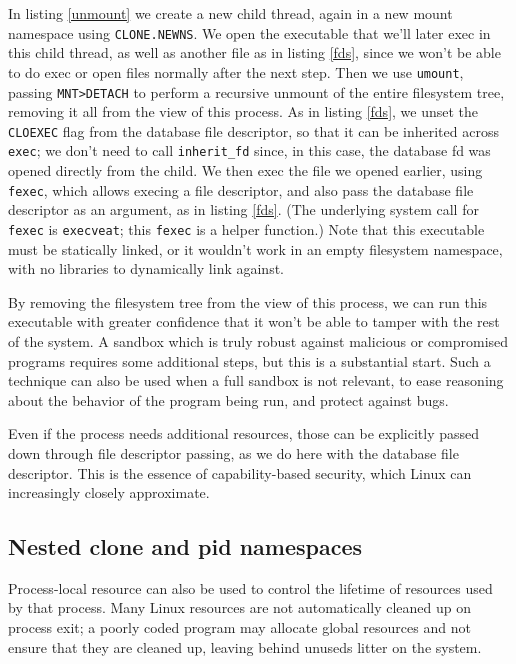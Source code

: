 \documentclass{acmart}
\begin{document}
In listing \ref{unmount}
we create a new child thread,
again in a new mount namespace using \texttt{CLONE.NEWNS}.
We open the executable that we'll later exec in this child thread,
as well as another file as in listing \ref{fds},
since we won't be able to do exec or open files normally after the next step.
Then we use \texttt{umount},
passing \texttt{MNT>DETACH} to perform a recursive unmount of the entire filesystem tree,
removing it all from the view of this process.
As in listing \ref{fds}, we unset the \texttt{CLOEXEC} flag from the database file descriptor,
so that it can be inherited across \texttt{exec};
we don't need to call \verb|inherit_fd| since, in this case, the database fd was opened directly from the child.
We then exec the file we opened earlier, using \texttt{fexec},
which allows execing a file descriptor,
and also pass the database file descriptor as an argument,
as in listing \ref{fds}.
(The underlying system call for \texttt{fexec} is \texttt{execveat};
this \texttt{fexec} is a helper function.)
Note that this executable must be statically linked,
or it wouldn't work in an empty filesystem namespace,
with no libraries to dynamically link against.

By removing the filesystem tree from the view of this process,
we can run this executable with greater confidence
that it won't be able to tamper with the rest of the system.
A sandbox which is truly robust against malicious or compromised programs requires some additional steps,
but this is a substantial start.
Such a technique can also be used when a full sandbox is not relevant,
to ease reasoning about the behavior of the program being run,
and protect against bugs.

Even if the process needs additional resources,
those can be explicitly passed down through file descriptor passing,
as we do here with the database file descriptor.
This is the essence of capability-based security,
which Linux can increasingly closely approximate.

\subsection{Nested clone and pid namespaces}
Process-local resource can also be used to control the lifetime of resources used by that process.
Many Linux resources are not automatically cleaned up on process exit;
a poorly coded program may allocate global resources
and not ensure that they are cleaned up,
leaving behind unuseds litter on the system.
\end{document}
